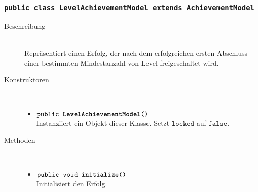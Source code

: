 		\subsubsection{\normalfont \texttt{public class \textbf{LevelAchievementModel} extends AchievementModel}}
		
		\begin{description}
		\item[Beschreibung] \hfill \\ Repräsentiert einen Erfolg, der nach dem erfolgreichen ersten Abschluss einer bestimmten Mindestanzahl von Level freigeschaltet wird.
			
		\item[Konstruktoren] \hfill \\
			\vspace{-.8cm}
			\begin{itemize}
				\item $\texttt{public \textbf{LevelAchievementModel}()}$ \\ Instanziiert ein Objekt dieser Klasse. Setzt $\texttt{locked}$ auf $\texttt{false}$.
			\end{itemize}
			
		\item[Methoden] \hfill \\
			\vspace{-.8cm}
			\begin{itemize}
				\item $\texttt{public void \textbf{initialize}()}$ \\ Initialisiert den Erfolg.
				

\end{itemize}
\end{description}
